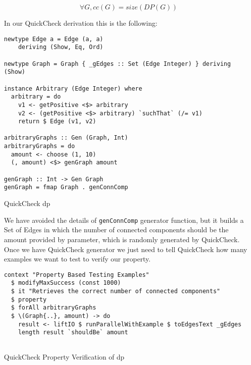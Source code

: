 \begin{equation}
  \forall G, cc(G) = size(DP(G))
\end{equation}

In our QuickCheck derivation this is the following:

\begin{listing}[H]
  \begin{verbatim}      
newtype Edge a = Edge (a, a)
    deriving (Show, Eq, Ord)
  
newtype Graph = Graph { _gEdges :: Set (Edge Integer) } deriving (Show)
  
instance Arbitrary (Edge Integer) where
  arbitrary = do
    v1 <- getPositive <$> arbitrary
    v2 <- (getPositive <$> arbitrary) `suchThat` (/= v1)
    return $ Edge (v1, v2)
  
arbitraryGraphs :: Gen (Graph, Int)
arbitraryGraphs = do
  amount <- choose (1, 10)
  (, amount) <$> genGraph amount
  
genGraph :: Int -> Gen Graph
genGraph = fmap Graph . genConnComp
\end{verbatim}
\caption{QuickCheck \acrshort{dp}}
\label{src:haskell:7}
\end{listing}

We have avoided the details of \texttt{genConnComp} generator function, but it builds a Set of Edges 
in which the number of connected components should be the amount provided by parameter, which is randomly generated by QuickCheck.
Once we have QuickCheck generator we just need to tell QuickCheck how many examples we want to test to verify our property.

\begin{listing}[H]
\begin{verbatim}      
context "Property Based Testing Examples"
  $ modifyMaxSuccess (const 1000)
  $ it "Retrieves the correct number of connected components"
  $ property
  $ forAll arbitraryGraphs 
  $ \(Graph{..}, amount) -> do 
    result <- liftIO $ runParallelWithExample $ toEdgesText _gEdges
    length result `shouldBe` amount
    
\end{verbatim}
\caption{QuickCheck Property Verification of \acrshort{dp}}
\label{src:haskell:8}
\end{listing}


